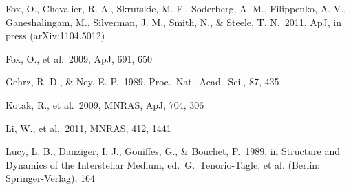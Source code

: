 \documentclass{emulateapj}
\begin{document}
\begin{references}
 Fox, O., Chevalier, R. A., Skrutskie, M. F., Soderberg,
A. M., Filippenko, A. V., Ganeshalingam, M., Silverman, J. M., Smith, N.,
\& Steele, T. N.\ 2011, ApJ, in press (arXiv:1104.5012)

 Fox, O., et al.\ 2009, ApJ, 691, 650




 Gehrz, R. D., \& Ney, E. P.\ 1989, Proc.\ Nat.\ Acad.\
Sci., 87, 435









 Kotak, R., et al.\ 2009, MNRAS, ApJ, 704, 306




 Li, W., et al.\ 2011, MNRAS, 412, 1441

 Lucy, L. B., Danziger, I. J., Gouiffes, G., \& Bouchet,
P.\ 1989, in Structure and Dynamics of the Interstellar Medium, ed.\
G.\ Tenorio-Tagle, et al. (Berlin: Springer-Verlag), 164


\end{references}
\end{document}
